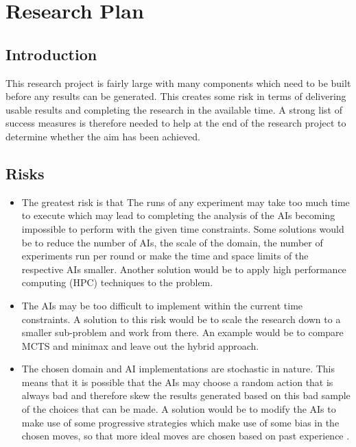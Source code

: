 \documentclass [11pt]{article}
\begin{document}
	\section{Research Plan}
	\subsection{Introduction}
	This research project is fairly large with many components which need to be built before any results can be generated. This creates some risk in terms of delivering usable results and completing the research in the available time. A strong list of success measures is therefore needed to help at the end of the research project to determine whether the aim has been achieved.
	
	\subsection{Risks}
	
	\begin{itemize}
		\item The greatest risk is that The runs of any experiment may take too much time to execute which may lead to completing the analysis of the AIs becoming impossible to perform with the given time constraints. Some solutions would be to reduce the number of AIs, the scale of the domain, the number of experiments run per round or make the time and space limits of the respective AIs smaller. Another solution would be to apply high performance computing (HPC) techniques to the problem.
		
		\item The AIs may be too difficult to implement within the current time constraints. A solution to this risk would be to scale the research down to a smaller sub-problem and work from there. An example would be to compare MCTS and minimax and leave out the hybrid approach.
		
		\item The chosen domain and AI implementations are stochastic in nature. This means that it is possible that the AIs may choose a random action that is always bad and therefore skew the results generated based on this bad sample of the choices that can be made. A solution would be to modify the AIs to make use of some progressive strategies which make use of some bias in the chosen moves, so that more ideal moves are chosen based on past experience \cite{progressive}.
		
	\end{itemize}
	
\end{document}
